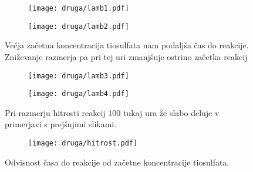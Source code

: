 \documentclass{article}
\begin{document}
\begin{figure}[H]
\begin{subfigure}{.49\textwidth}
\texttt{[image: druga/lamb1.pdf]}
\end{subfigure}
\begin{subfigure}{.49\textwidth}
\texttt{[image: druga/lamb2.pdf]}
\end{subfigure}
\caption*{Večja začetna koncentracija tiosulfata nam podaljša čas do reakcije. Zniževanje razmerja pa pri tej uri zmanjšuje ostrino začetka reakcij}
\end{figure}

\begin{figure}[H]
\begin{subfigure}{.49\textwidth}
\texttt{[image: druga/lamb3.pdf]}
\end{subfigure}
\begin{subfigure}{.49\textwidth}
\texttt{[image: druga/lamb4.pdf]}
\end{subfigure}
\caption*{Pri razmerju hitrosti reakcij 100 tukaj ura že slabo deluje v primerjavi s prejšnjimi slikami.}
\end{figure}

\begin{figure}[H]
\centering
\begin{subfigure}{\textwidth}
\texttt{[image: druga/hitrost.pdf]}
\end{subfigure}
\caption*{Odvisnost časa do reakcije od začetne koncentracije tiosulfata.}
\end{figure}
\end{document}
